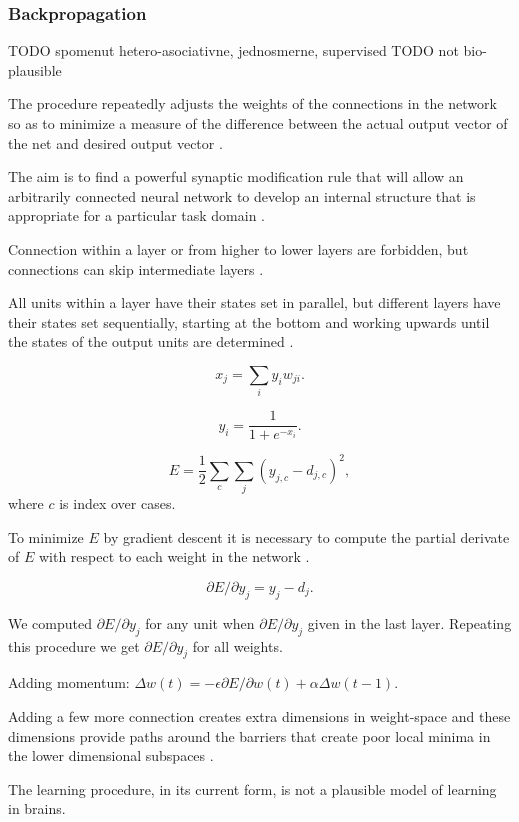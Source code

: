\subsubsection{Backpropagation}

TODO spomenut hetero-asociativne, jednosmerne, supervised 
TODO not bio-plausible 

The procedure repeatedly adjusts the weights of the connections in the network so as to minimize a measure of the difference between the actual output vector of the net and desired output vector \citet{rumelhart1986learning}. 

The aim is to find a powerful synaptic modification rule that will allow an arbitrarily connected neural network to develop an internal structure that is appropriate for a particular task domain \citet{rumelhart1986learning}. 

Connection within a layer or from higher to lower layers are forbidden, but connections can skip intermediate layers \citet{rumelhart1986learning}.

All units within a layer have their states set in parallel, but different layers have their states set sequentially, starting at the bottom and working upwards until the states of the output units are determined \citet{rumelhart1986learning}. 

$$x_j = \sum_i y_iw_{ji}.$$

$$y_i = \frac{1}{1 + e^{-x_i}}.$$

$$E = \frac{1}{2} \sum_c \sum_j (y_{j,c} - d_{j,c})^2,$$
where $c$ is index over cases. 

To minimize $E$ by gradient descent it is necessary to compute the partial derivate of $E$ with respect to each weight in the network \citet{rumelhart1986learning}. 

$$\partial E / \partial y_j = y_j - d_j.$$

We computed $\partial E / \partial y_j$ for any unit when $\partial E / \partial y_j$ given in the last layer. Repeating this procedure we get $\partial E / \partial y_j$ for all weights. 

Adding momentum:
$\Delta w(t) = -\epsilon \partial E/ \partial w(t) + \alpha \Delta w(t-1).$

Adding a few more connection creates extra dimensions in weight-space and these dimensions provide paths around the barriers that create poor local minima in the lower dimensional subspaces \citet{rumelhart1986learning}. 

The learning procedure, in its current form, is not a plausible model of learning in brains. 


